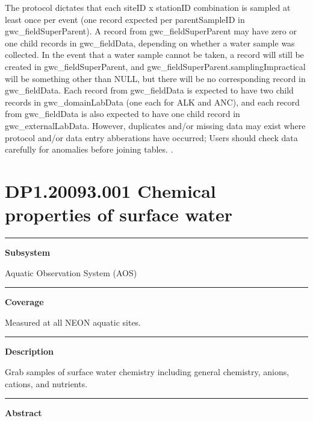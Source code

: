 \documentclass[]{article}
\begin{document}
The protocol dictates that each siteID x stationID combination is
sampled at least once per event (one record expected per parentSampleID
in gwc\_fieldSuperParent). A record from gwc\_fieldSuperParent may have
zero or one child records in gwc\_fieldData, depending on whether a
water sample was collected. In the event that a water sample cannot be
taken, a record will still be created in gwc\_fieldSuperParent, and
gwc\_fieldSuperParent.samplingImpractical will be something other than
NULL, but there will be no corresponding record in gwc\_fieldData. Each
record from gwc\_fieldData is expected to have two child records in
gwc\_domainLabData (one each for ALK and ANC), and each record from
gwc\_fieldData is also expected to have one child record in
gwc\_externalLabData. However, duplicates and/or missing data may exist
where protocol and/or data entry abberations have occurred; Users should
check data carefully for anomalies before joining tables. \newpage
.

\section{DP1.20093.001 Chemical properties of surface
water}\label{dp1.20093.001-chemical-properties-of-surface-water}

\begin{center}\rule{0.5\linewidth}{\linethickness}\end{center}

\textbf{Subsystem}

Aquatic Observation System (AOS)

\begin{center}\rule{0.5\linewidth}{\linethickness}\end{center}

\textbf{Coverage}

Measured at all NEON aquatic sites.

\begin{center}\rule{0.5\linewidth}{\linethickness}\end{center}

\textbf{Description}

Grab samples of surface water chemistry including general chemistry,
anions, cations, and nutrients.

\begin{center}\rule{0.5\linewidth}{\linethickness}\end{center}

\textbf{Abstract}
\end{document}
